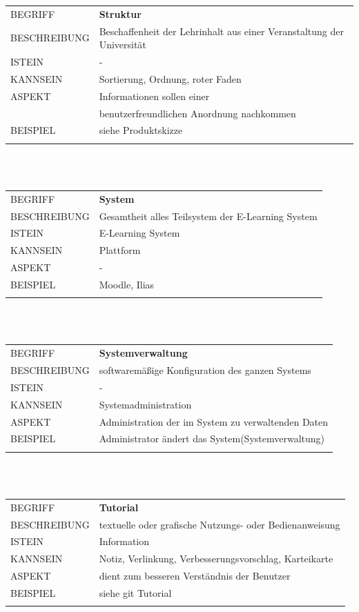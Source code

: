 \documentclass[12pt,a4paper]{article}
\begin{document}
\begin{tabular}{l p{12cm}}
BEGRIFF 	 & \textbf{Struktur} \\ 
BESCHREIBUNG & Beschaffenheit der Lehrinhalt aus einer Veranstaltung der 					   Universität\\ 
ISTEIN   	 & - \\
KANNSEIN 	 & Sortierung, Ordnung, roter Faden\\ 
ASPEKT   	 & Informationen sollen einer\\
			 & benutzerfreundlichen Anordnung nachkommen\\
BEISPIEL 	 & siehe Produktskizze\\\\
\hline
\end{tabular}\\\\ 

\begin{tabular}{l p{12cm}} 
BEGRIFF 	 & \textbf{System} \\ 
BESCHREIBUNG & Gesamtheit alles Teilsystem der E-Learning System \\ 
ISTEIN   	 & E-Learning System\\
KANNSEIN 	 & Plattform\\ 
ASPEKT   	 & -\\
BEISPIEL 	 & Moodle, Ilias\\\\
\hline
\end{tabular}\\\\  

\begin{tabular}{l p{12cm}}
BEGRIFF 	 & \textbf{Systemverwaltung} \\ 
BESCHREIBUNG & softwaremäßige Konfiguration des ganzen Systems\\ 
ISTEIN   	 & -\\
KANNSEIN 	 & Systemadministration\\ 
ASPEKT   	 & Administration der im System zu verwaltenden Daten\\
BEISPIEL 	 & Administrator ändert das System(Systemverwaltung)\\\\
\hline
\end{tabular}\\\\  

\begin{tabular}{l p{12cm}}
BEGRIFF 	 & \textbf{Tutorial} \\ 
BESCHREIBUNG & textuelle oder grafische Nutzungs- oder 							   Bedienanweisung \\ 
ISTEIN   	 & Information\\
KANNSEIN 	 & Notiz, Verlinkung, Verbesserungsvorschlag, Karteikarte\\ 
ASPEKT   	 & dient zum besseren Verständnis der Benutzer\\
BEISPIEL 	 & siehe git Tutorial\\\\
\hline
\end{tabular}\\\\  
\end{document}
